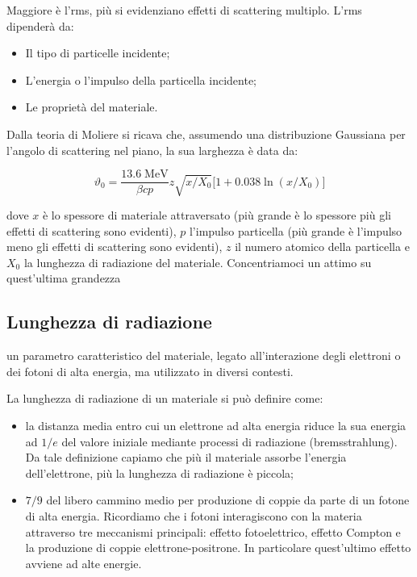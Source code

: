 Maggiore è l'rms, più si evidenziano effetti di scattering multiplo. L'rms dipenderà da:

\begin{itemize}
    \item Il tipo di particelle incidente;
    \item L'energia o l'impulso della particella incidente;
    \item Le proprietà del materiale.
\end{itemize}

Dalla teoria di Moliere si ricava che, assumendo una distribuzione Gaussiana per l'angolo di scattering nel piano, la sua larghezza è data da:

$$\vartheta_0=\frac{13.6 \; \text{MeV}}{\beta c p} z \sqrt{x/X_0} \big[ 1 + 0.038 \ln(x/X_0) \big]$$

dove $x$ è lo spessore di materiale attraversato (più grande è lo spessore più gli effetti di scattering sono evidenti), $p$ l'impulso particella (più grande è l'impulso meno gli effetti di scattering sono evidenti), $z$ il numero atomico della particella e $X_0$ la lunghezza di radiazione del materiale. Concentriamoci un attimo su quest'ultima grandezza

\subsection{Lunghezza di radiazione}

\E un parametro caratteristico del materiale, legato all'interazione degli elettroni o dei fotoni di alta energia, ma utilizzato in diversi contesti.

La lunghezza di radiazione di un materiale si può definire come:

\begin{itemize}
    \item la distanza media entro cui un elettrone ad alta energia riduce la sua energia ad $1/e$ del valore iniziale mediante processi di radiazione (bremsstrahlung). Da tale definizione capiamo che più il materiale assorbe l'energia dell'elettrone, più la lunghezza di radiazione è piccola;
    \item $7/9$ del libero cammino medio per produzione di coppie da parte di un fotone di alta energia. Ricordiamo che i fotoni interagiscono con la materia attraverso tre meccanismi principali: effetto fotoelettrico, effetto Compton e la produzione di coppie elettrone-positrone. In particolare quest'ultimo effetto avviene ad alte energie.
\end{itemize}


